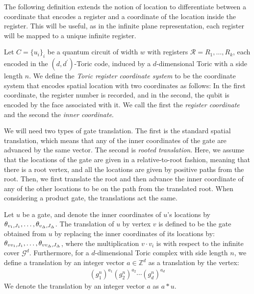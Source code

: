 The following definition extends the notion of location to differentiate between a coordinate that encodes a register and a coordinate of the location inside the register. This will be useful, as in the infinite plane representation, each register will be mapped to a unique infinite register. %
\begin{definition}
  Let $C=\{u_i\}_i$ be a quantum circuit of width $w$ with registers $\mathcal{R}=R_{1},\ldots,R_{k}$, each encoded in the $(d,d^{\prime})$-Toric code, induced by a $d$-dimensional Toric with a side length $n$. We define the \textit{Toric register coordinate system} to be the coordinate system that encodes spatial location with two coordinates as follows: In the first coordinate, the register number is recorded, and in the second, the qubit is encoded by the face associated with it. We call the first the \textit{register coordinate} and the second the \textit{inner coordinate}.
\end{definition}


We will need two types of gate translation. The first is the standard spatial translation, which means that any of the inner coordinates of the gate are advanced by the same vector. The second is \textit{rooted translation}. Here, we assume that the locations of the gate are given in a relative-to-root fashion, meaning that there is a root vertex, and all the locations are given by positive paths from the root. Then, we first translate the root and then advance the inner coordinate of any of the other locations to be on the path from the translated root. When considering a product gate, the translations act the same.   
\begin{definition}
  Let $u$ be a gate, and denote the inner coordinates of $u$'s locations by $\theta_{v_{1} ,J_{1}}, \ldots, \theta_{v_{\Delta} ,J_{\Delta}}$. The translation of $u$ by vertex $v$ is defined to be the gate obtained from $u$ by replacing the inner coordinates of its locations by: $\theta_{v v_{1} ,J_{1}}, \ldots, \theta_{v v_{\Delta} ,J_{\Delta}}$, where the multiplication $v \cdot v_{i}$ is with respect to the infinite cover $\mathcal{G}^{d}$.
  Furthermore, for a $d$-dimensional Toric complex with side length $n$, we define a translation by an integer vector $a \in \mathbb{Z}^{d}$ as a translation by the vertex:
   \begin{equation*}
     \begin{split}
       (g_{1}^{n})^{a_{1}} (g_{2}^{n})^{a_{2}} \cdots (g_{d}^{n})^{a_{d}}
     \end{split}
   \end{equation*}
    We denote the translation by an integer vector $a$ as $a * u$.
\end{definition}



